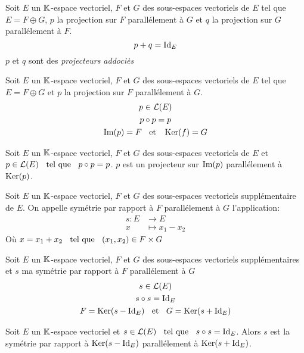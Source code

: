 \begin{dfn}
Soit $E$ un $\mathbb{K}$-espace vectoriel, $F$ et $G$ des sous-espaces vectoriels
de $E$ tel que $E = F \oplus G$, $p$ la projection sur $F$ parallélement à
$G$ et $q$ la projection sur $G$ parallélement à $F$.
\[
    p + q = \operatorname{Id}_E
\]
$p$ et $q$ sont des \emph{projecteurs addociès}
\end{dfn}

\begin{prp}
Soit $E$ un $\mathbb{K}$-espace vectoriel, $F$ et $G$ des sous-espaces vectoriels
de $E$ tel que $E = F \oplus G$ et $p$ la projection sur $F$ parallélement à
$G$.
\begin{gather*}
    p \in \operatorname{\mathcal{L}}(E) \\
    p \circ p = p \\
    \operatorname{Im}(p) = F \;\;\text{ et }\;\; \operatorname{Ker}(f) = G
\end{gather*}
\end{prp}

\begin{prp}
Soit $E$ un $\mathbb{K}$-espace vectoriel, $F$ et $G$ des sous-espaces vectoriels
de $E$ et $p \in \operatorname{\mathcal{L}}(E) \;\;\text{ tel que }\;\; p \circ p = p$.
$p$ est un projecteur sur $\operatorname{Im}(p)$ parallélement à $\operatorname{Ker}(p)$.
\end{prp}

\begin{dfn}[Symétrie]
Soit $E$ un $\mathbb{K}$-espace vectoriel, $F$ et $G$ des sous-espaces vectoriels
supplémentaire de $E$. On appelle symétrie par rapport à $F$ parallélement
à $G$ l'application:
\begin{align*}
    s:  E &\to E \\
        x &\mapsto x_1 - x_2
\end{align*}
Où $x = x_1 + x_2 \;\;\text{ tel que }\;\; (x_1, x_2) \in F \times G$
\end{dfn}

\begin{prp}
Soit $E$ un $\mathbb{K}$-espace vectoriel, $F$ et $G$ des sous-espaces vectoriels
supplémentaires et $s$ ma symétrie par rapport à $F$ parallélement à $G$
\begin{gather*}
s \in \operatorname{\mathcal{L}}(E) \\
s \circ s = \operatorname{Id}_E \\
F = \operatorname{Ker}(s - \operatorname{Id}_E) \;\;\text{ et }\;\; G = \operatorname{Ker}(s + \operatorname{Id}_E)
\end{gather*}
\end{prp}

\begin{prp}
Soit $E$ un $\mathbb{K}$-espace vectoriel et $s \in \operatorname{\mathcal{L}}(E) \;\;\text{ tel que }\;\; s \circ s = \operatorname{Id}_E$.
Alors $s$ est la symétrie par rapport à $\operatorname{Ker}(s - \operatorname{Id}_E)$ parallélement à
$\operatorname{Ker}(s + \operatorname{Id}_E)$.
\end{prp}



